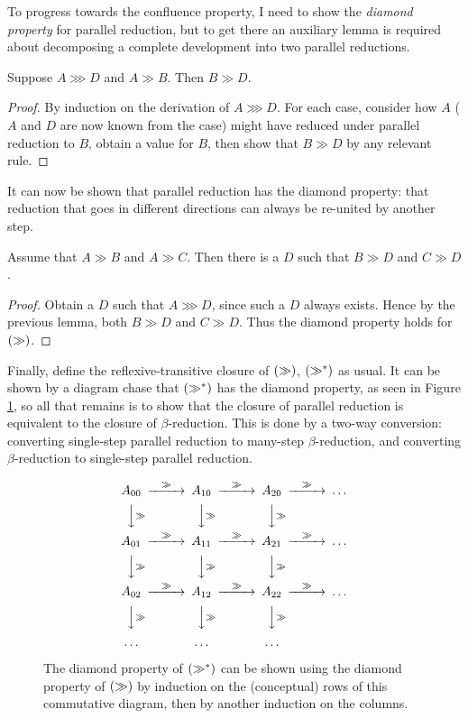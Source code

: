 To progress towards the confluence property, I need to show the \emph{diamond property} for parallel reduction, but to get there an auxiliary lemma is required about decomposing a complete development into two parallel reductions.

\begin{lemma}
Suppose \(A \ggg D\) and \(A \gg B\).
Then \(B \gg D\).
\end{lemma}
\begin{proof}
By induction on the derivation of \(A \ggg D\).
For each case, consider how \(A\) (\(A\) and \(D\) are now known from the case) might have reduced under parallel reduction to \(B\), obtain a value for \(B\), then show that \(B \gg D\) by any relevant rule.
\end{proof}

It can now be shown that parallel reduction has the diamond property: that reduction that goes in different directions can always be re-united by another step.

\begin{lemma}
Assume that \(A \gg B\) and \(A \gg C\).
Then there is a \(D\) such that \(B \gg D\) and \(C \gg D\).
\end{lemma}
\begin{proof}
Obtain a \(D\) such that \(A \ggg D\), since such a \(D\) always exists.
Hence by the previous lemma, both \(B \gg D\) and \(C \gg D\).
Thus the diamond property holds for \(\left(\gg\right)\).
\end{proof}

Finally, define the reflexive-transitive closure of \(\left(\gg\right)\), \(\left(\gg^*\right)\) as usual.
It can be shown by a diagram chase that \(\left(\gg^*\right)\) has the diamond property, as seen in Figure \ref{fig:diagram-chase}, so all that remains is to show that the closure of parallel reduction is equivalent to the closure of \(\beta\)-reduction.
This is done by a two-way conversion: converting single-step parallel reduction to many-step \(\beta\)-reduction, and converting \(\beta\)-reduction to single-step parallel reduction.

\begin{figure}
\[
\begin{CD}
A_{00}	@>\gg>>	A_{10}	@>\gg>>	A_{20}	@>\gg>>	\ldots\\
@VV\gg{}V	@VV\gg{}V	@VV\gg{}V\\
A_{01}	@>\gg>>	A_{11}	@>\gg>>	A_{21}	@>\gg>>	\ldots\\
@VV\gg{}V	@VV\gg{}V	@VV\gg{}V\\
A_{02}	@>\gg>>	A_{12}	@>\gg>>	A_{22}	@>\gg>>	\ldots\\
@VV\gg{}V	@VV\gg{}V	@VV\gg{}V\\
\ldots&		&\ldots&	&\ldots\\
\end{CD}
\]
\caption{The diamond property of \(\left(\gg^*\right)\) can be shown using the diamond property of \(\left(\gg\right)\) by induction on the (conceptual) rows of this commutative diagram, then by another induction on the columns.}
\label{fig:diagram-chase}
\end{figure}

